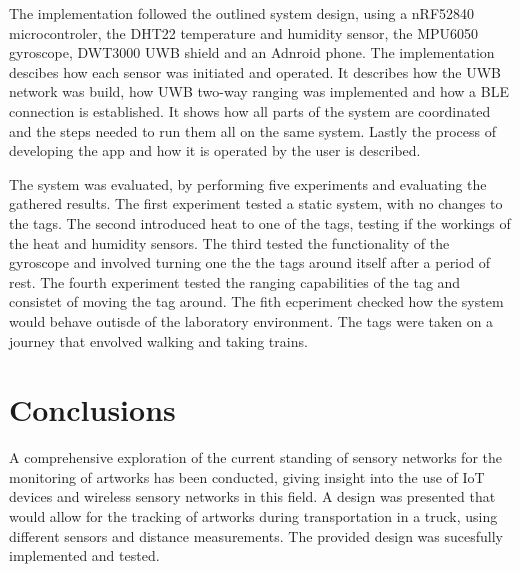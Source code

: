 The implementation followed the outlined system design, using a nRF52840 microcontroler, the DHT22 temperature and humidity sensor, the MPU6050 gyroscope, DWT3000 UWB shield and an Adnroid phone.
The implementation descibes how each sensor was initiated and operated.
It describes how the UWB network was build, how UWB two-way ranging was implemented and how a BLE connection is established.
It shows how all parts of the system are coordinated and the steps needed to run them all on the same system.
Lastly the process of developing the app and how it is operated by the user is described.


The system was evaluated, by performing five experiments and evaluating the gathered results. 
The first experiment tested a static system, with no changes to the tags. 
The second introduced heat to one of the tags, testing if the workings of the heat and humidity sensors.
The third tested the functionality of the gyroscope and involved turning one the the tags around itself after a period of rest.
The fourth experiment tested the ranging capabilities of the tag and consistet of moving the tag around.
The fith ecperiment checked how the system would behave outisde of the laboratory environment. The tags were taken on a journey that envolved walking and taking trains.

\section{Conclusions}
\label{s:Conclusion}

A comprehensive exploration of the current standing of sensory networks for the monitoring of artworks has been conducted, giving insight into the use of IoT devices and wireless sensory networks in this field.
A design was presented that would allow for the tracking of artworks during transportation in a truck, using different sensors and distance measurements.
The provided design was sucesfully implemented and tested.


